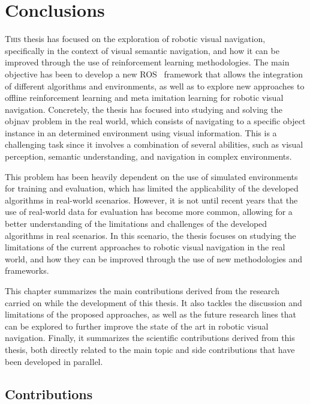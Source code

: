 \chapter{Conclusions}\label{ch:conclusions}

\lettrine{\textcolor{accent_color}{T}}{his} thesis has focused on the exploration of robotic visual navigation, specifically in the context of visual semantic navigation, and how it can be improved through the use of reinforcement learning methodologies.
The main objective has been to develop a new ROS~\cite{ros} framework that allows the integration of different algorithms and environments, as well as to explore new approaches to offline reinforcement learning and meta imitation learning for robotic visual navigation.
Concretely, the thesis has focused into studying and solving the \acrshort{objnav} problem in the real world, which consists of navigating to a specific object instance in an determined environment using visual information.
This is a challenging task since it involves a combination of several abilities, such as visual perception, semantic understanding, and navigation in complex environments.

This problem has been heavily dependent on the use of simulated environments for training and evaluation, which has limited the applicability of the developed algorithms in real-world scenarios.
However, it is not until recent years that the use of real-world data for evaluation has become more common, allowing for a better understanding of the limitations and challenges of the developed algorithms in real scenarios.
In this scenario, the thesis focuses on studying the limitations of the current approaches to robotic visual navigation in the real world, and how they can be improved through the use of new methodologies and frameworks.

This chapter summarizes the main contributions derived from the research carried on while the development of this thesis.
It also tackles the discussion and limitations of the proposed approaches, as well as the future research lines that can be explored to further improve the state of the art in robotic visual navigation.
Finally, it summarizes the scientific contributions derived from this thesis, both directly related to the main topic and side contributions that have been developed in parallel.

\section{Contributions}\label{sec:contributions}

